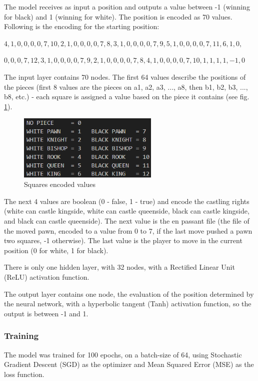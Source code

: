 The model receives as input a position and outputs a value between -1 (winning for black) and 1 (winning for white). The position is encoded as 70 values. Following is the encoding for the starting position:

$4,1,0,0,0,0,7,10,2,1,0,0,0,0,7,8,3,1,0,0,0,0,7,9,5,1,0,0,0,0,7,11,6,1,0,$

$0,0,0,7,12,3,1,0,0,0,0,7,9,2,1,0,0,0,0,7,8,4,1,0,0,0,0,7,10,1,1,1,1,-1,0$

The input layer contains 70 nodes. The first 64 values describe the positions of the pieces (first 8 values are the pieces on a1, a2, a3, ..., a8, then b1, b2, b3, ..., b8, etc.) - each square is assigned a value based on the piece it contains (see fig. \ref{fig:squaresEncodedValues}).

\begin{figure}[h]
    \centering
    \includegraphics[width=0.6\textwidth]{figures/squares-encoded-values.png}
    \caption{Squares encoded values}
    \label{fig:squaresEncodedValues}
\end{figure}

The next 4 values are boolean (0 - false, 1 - true) and encode the castling rights (white can castle kingside, white can castle queenside, black can castle kingside, and black can castle queenside). The next value is the en passant file (the file of the moved pawn, encoded to a value from 0 to 7, if the last move pushed a pawn two squares, -1 otherwise). The last value is the player to move in the current position (0 for white, 1 for black).

There is only one hidden layer, with 32 nodes, with a Rectified Linear Unit (ReLU) activation function.

The output layer contains one node, the evaluation of the position determined by the neural network, with a hyperbolic tangent (Tanh) activation function, so the output is between -1 and 1.

\subsubsection{Training}
\label{subsec:ch4sec3subsec2subsubsec3}


The model was trained for 100 epochs, on a batch-size of 64, using Stochastic Gradient Descent (SGD) as the optimizer and Mean Squared Error (MSE) as the loss function.